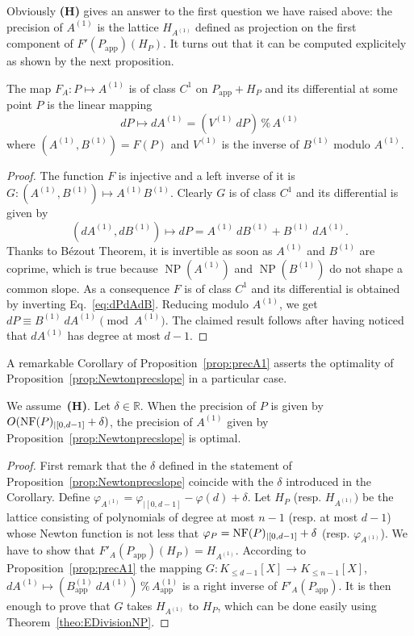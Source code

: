 \documentclass{sig-alternate-05-2015}
\DeclareMathOperator{\NP}{NP}
\newcommand{\R}{\mathbb R}
\newcommand{\NF}{\text{\rm NF}}
\renewcommand{\mod}{\,\%\,}
\newcommand{\app}{\textrm{app}}
\begin{document}
\bigskip

\noindent
Obviously \textbf{(H)} gives an answer to the first question we have 
raised above: the precision of $A^{(1)}$ is the lattice 
$H_{A^{(1)}}$ defined as projection on the first component of 
$F'(P_\app)(H_P)$. It turns out that it can be computed explicitely as 
shown by the next proposition.

\begin{prop}
\label{prop:precA1}
The map $F_A : P \mapsto A^{(1)}$ is of class $C^1$ on $P_\app + H_P$
and its differential at some point $P$ is the linear mapping
$$dP \mapsto dA^{(1)} = (V^{(1)} \: dP) \mod A^{(1)}$$
where $(A^{(1)}, B^{(1)}) = F(P)$ and $V^{(1)}$ is the inverse of 
$B^{(1)}$ modulo $A^{(1)}$.
\end{prop}

\begin{proof}
The function $F$ is injective and a left inverse of it is
$G : (A^{(1)},B^{(1)}) \mapsto A^{(1)}B^{(1)}$.
Clearly $G$ is of class $C^1$ and its differential is given by
\begin{equation}
\label{eq:dPdAdB}
(dA^{(1)}, dB^{(1)}) \mapsto dP = A^{(1)} \: dB^{(1)} + B^{(1)} \: dA^{(1)}.
\end{equation}
Thanks to Bézout Theorem, it is invertible as soon as $A^{(1)}$ and 
$B^{(1)}$ are coprime, which is true because $\NP(A^{(1)})$ and 
$\NP(B^{(1)})$ do not shape a common slope. As a consequence $F$ is of 
class $C^1$ and its differential is obtained by inverting 
Eq.~\eqref{eq:dPdAdB}. Reducing modulo $A^{(1)}$, we get $dP \equiv 
B^{(1)} \: dA^{(1)} \pmod {A^{(1)}}$. The claimed result follows after 
having noticed that $dA^{(1)}$ has degree at most $d{-}1$.
\end{proof}

A remarkable Corollary of Proposition~\ref{prop:precA1} asserts the
optimality of Proposition~\ref{prop:Newtonprecslope} in a particular 
case.

\begin{cor}
We assume~\textbf{(H)}. Let $\delta \in \R$.
When the precision of $P$ is given by $O(\NF(P)_{|[0,d-1]} + \delta)$,
the precision of $A^{(1)}$ given by 
Proposition~\ref{prop:Newtonprecslope} is optimal.
\end{cor}

\begin{proof}
First remark that the $\delta$ defined in the statement of 
Proposition~\ref{prop:Newtonprecslope} coincide with the $\delta$
introduced in the Corollary. Define
$\varphi_{A^{(1)}} = \varphi_{|[0,d{-}1]} - \varphi(d) + \delta$.
Let $H_P$ (resp. $H_{A^{(1)}})$ be the lattice consisting of
polynomials of degree at most $n{-}1$ (resp. at most $d{-}1$)
whose Newton function is not less that $\varphi_P = \NF(P)_{|[0,d-1]} + \delta$ (resp. 
$\varphi_{A^{(1)}}$). We have to show that $F'_A(P_\app)(H_P) = 
H_{A^{(1)}}$. According to Proposition~\ref{prop:precA1}
the mapping $G : K_{\leq d{-}1}[X] \to K_{\leq n{-}1}[X]$,
$dA^{(1)} \mapsto (B_\app^{(1)} \: dA^{(1)}) \mod A_\app^{(1)}$
is a right inverse of $F'_A(P_\app)$. It is then enough to prove
that $G$ takes $H_{A^{(1)}}$ to $H_P$, which can be done easily
using Theorem~\ref{theo:EDivisionNP}.
\end{proof}
\end{document}

